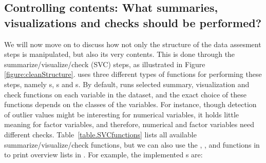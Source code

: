 \documentclass[article,shortnames]{jss}
\begin{document}
\subsection{Controlling contents: What summaries, visualizations and checks should be performed?}
We will now move on to discuss how not only the structure of the
data assesment steps is manipulated, but also its very contents. This is
done through the summarize/visualize/check (SVC) steps, as illustrated
in Figure \ref{figure:cleanStructure}.   uses three
different types of functions for performing these steps, namely
s, s and
s.  By default,  runs selected summary,
visualization and check functions on each variable in the dataset, and
the exact choice of these functions depends on the classes of the
variables. For instance, though detection of outlier values might be
interesting for numerical variables, it holds little meaning for
factor variables, and therefore, numerical and factor variables need
different checks. Table~\ref{table.SVCfunctions} lists all available
summarize/visualize/check functions, but we can also use the
, , and
 functions in  to print overview
lists in . For example, the implemented
s are:

\end{document}

